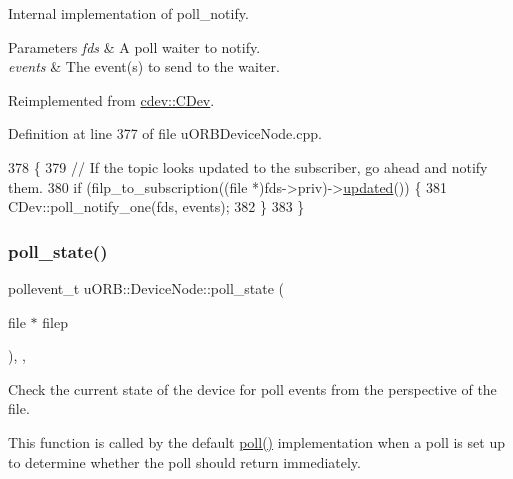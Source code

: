 Internal implementation of poll\+\_\+notify.


\begin{DoxyParams}{Parameters}
{\em fds} & A poll waiter to notify. \\
\hline
{\em events} & The event(s) to send to the waiter. \\
\hline
\end{DoxyParams}


Reimplemented from \hyperlink{classcdev_1_1CDev_ada35d652d0f6d7257fffe4ead0fbb6dd}{cdev\+::\+C\+Dev}.



Definition at line 377 of file u\+O\+R\+B\+Device\+Node.\+cpp.


\begin{DoxyCode}
378 \{
379     \textcolor{comment}{// If the topic looks updated to the subscriber, go ahead and notify them.}
380     \textcolor{keywordflow}{if} (filp\_to\_subscription((file *)fds->priv)->\hyperlink{classuORB_1_1SubscriptionInterval_aa1c12b83d65604e306b919a2c224e32e}{updated}()) \{
381         CDev::poll\_notify\_one(fds, events);
382     \}
383 \}
\end{DoxyCode}
\mbox{\label{classuORB_1_1DeviceNode_a3ac7d5c93e5fd480cd623fd421afa060}} 
\subsubsection{\texorpdfstring{poll\+\_\+state()}{poll\_state()}}
{\footnotesize\ttfamily pollevent\+\_\+t u\+O\+R\+B\+::\+Device\+Node\+::poll\+\_\+state (\begin{DoxyParamCaption}\item[{file $\ast$}]{filep }\end{DoxyParamCaption})\hspace{0.3cm}{\ttfamily [override]}, {\ttfamily [protected]}, {\ttfamily [virtual]}}

Check the current state of the device for poll events from the perspective of the file.

This function is called by the default \hyperlink{classcdev_1_1CDev_a219a565bb1842c62e0f45a7eeaaec0d3}{poll()} implementation when a poll is set up to determine whether the poll should return immediately.


